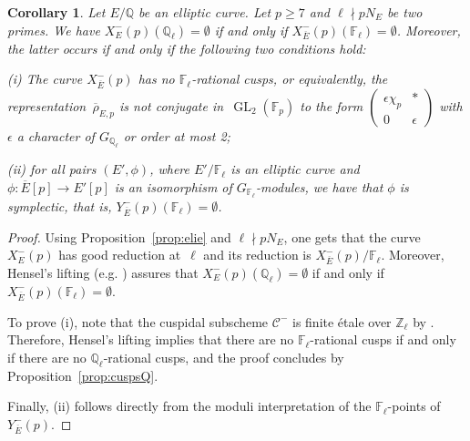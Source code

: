 \documentclass[12pt]{amsart}
\numberwithin{equation}{section}
\newtheorem{corollary}[equation]{Corollary}
\theoremstyle{definition}
\newcommand{\F}{\mathbb{F}}
\newcommand{\Q}{\mathbb{Q}}
\newcommand{\Z}{\mathbb{Z}}
\newcommand{\rhobar}{{\overline{\rho}}}
\DeclareMathOperator{\GL}{GL}
\newcommand{\oE}{\overline{E}}
\begin{document}
\begin{corollary}\label{rmk}
Let $E/\Q$ be an elliptic curve. Let $p\geq 7$ and $\ell \nmid pN_E$ be two primes. 
We have $X_E^-(p)(\Q_\ell) = \emptyset$ if and only if $X_{\oE}^-(p)(\F_\ell) = \emptyset$. Moreover, the latter occurs if and only if the following two conditions hold:  

(i) The curve $X_{\oE}^-(p)$  has no $\F_\ell$-rational cusps, or equivalently, the representation~$\rhobar_{E,p}$ is not conjugate 
in~$\GL_2(\F_p)$  to the form 
$\left(\begin{smallmatrix}
				\epsilon \chi_p & * \\
				0 & \epsilon
			\end{smallmatrix} \right)$ 
            with $\epsilon$ a character of $G_{\Q_\ell}$ or order at most 2;

(ii) for all pairs $(E',\phi)$, where $E'/\F_\ell$ is an elliptic curve and $\phi: \oE[p] \to
E'[p]$ is an isomorphism of $G_{\F_\ell}$-modules, we have that $\phi$ is symplectic, that is, $Y_{\oE}^-(p)(\F_\ell) = \emptyset$.
\end{corollary}
\begin{proof}
Using Proposition~\ref{prop:elie} and $\ell \nmid pN_E$, one gets that the curve $X_E^-(p)$ has good reduction at~$\ell$ and its reduction is $X_{\overline{E}}^-(p)/\F_\ell$. Moreover, Hensel's lifting (e.g. \cite[Lemma 1.1]{Jordan}) assures that $X_E^-(p)(\Q_\ell) = \emptyset$ if and only if $X_{\oE}^-(p)(\F_\ell) = \emptyset$.

To prove (i), note that the cuspidal subscheme $\mathcal{C}^-$ is finite \'etale over $\Z_\ell$ by \cite[Theorem 3]{elie}. Therefore, Hensel's lifting implies that there are no $\F_\ell$-rational cusps if and only if there are no $\Q_\ell$-rational cusps, and the proof concludes by Proposition~\ref{prop:cuspsQ}.

Finally, (ii) follows directly from the moduli interpretation of the $\F_\ell$-points of $Y_{\oE}^-(p)$.
\end{proof}
\end{document}
